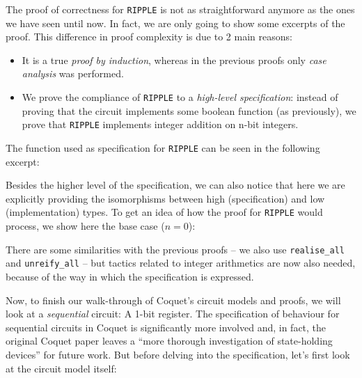             The proof of correctness for \texttt{RIPPLE} is not as straightforward anymore as the
            ones we have seen until now. In fact, we are only going to show some excerpts of the
            proof. This difference in proof complexity is due to 2 main reasons:

            \begin{itemize}
                \item It is a true \emph{proof by induction}, whereas in the previous proofs only
                    \emph{case analysis} was performed.
                \item We prove the compliance of \texttt{RIPPLE} to a \emph{high-level
                        specification}: instead of proving that the circuit implements some boolean
                    function (as previously), we prove that \texttt{RIPPLE} implements integer
                    addition on n-bit integers.
            \end{itemize}

            The function used as specification for \texttt{RIPPLE} can be seen in the following
            excerpt:


            Besides the higher level of the specification, we can also notice that here we are
            explicitly providing the isomorphisms between high (specification) and low
            (implementation) types. To get an idea of how the proof for \texttt{RIPPLE} would
            process, we show here the base case ($n = 0$):


            There are some similarities with the previous proofs -- we also use
            \texttt{realise\_all} and \texttt{unreify\_all} -- but tactics related to integer
            arithmetics are now also needed, because of the way in which the specification is
            expressed.

            Now, to finish our walk-through of Coquet's circuit models and proofs, we will look at a
            \emph{sequential} circuit: A 1-bit register. The specification of behaviour for
            sequential circuits in Coquet is significantly more involved and, in fact, the original
            Coquet paper\cite{coquet2011} leaves a ``more thorough investigation of state-holding
            devices'' for future work. But before delving into the specification, let's first look
            at the circuit model itself:

